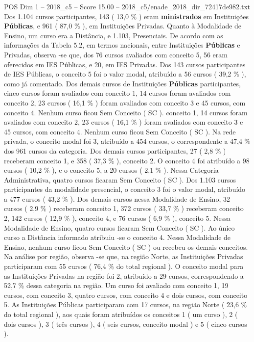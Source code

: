 \begin{textsample}{POS Dim 1 – 2018\_c5 – Score 15.00 – 2018\_c5/enade\_2018\_dir\_72417de982.txt}
Dos 1.104 cursos participantes, 143 ( 13,0 \% ) eram \textbf{ministrados} em Instituições \textbf{Públicas}, e 961 ( 87,0 \% ), em Instituições Privadas.
Quanto à Modalidade de Ensino, um curso era a Distância, e 1.103, Presenciais.
De acordo com as informações da Tabela 5.2, em termos nacionais, entre Instituições \textbf{Públicas} e Privadas, observa -se que, dos 76 cursos avaliados com conceito 5, 56 eram oferecidos em IES Públicas, e 20, em IES Privadas.
Dos 143 cursos participantes de IES Públicas, o conceito 5 foi o valor modal, atribuído a 56 cursos ( 39,2 \% ), como já comentado.
Dos demais cursos de Instituições \textbf{Públicas} participantes, cinco cursos foram avaliados com conceito 1, 14 cursos foram avaliados com conceito 2, 23 cursos ( 16,1 \% ) foram avaliados com conceito 3 e 45 cursos, com conceito 4.
Nenhum curso ficou Sem Conceito ( SC ). conceito 1, 14 cursos foram avaliados com conceito 2, 23 cursos ( 16,1 \% ) foram avaliados com conceito 3 e 45 cursos, com conceito 4.
Nenhum curso ficou Sem Conceito ( SC ).
Na rede privada, o conceito modal foi 3, atribuído a 454 cursos, o correspondente a 47,4 \% dos 961 cursos da categoria.
Dos demais cursos participantes, 27 ( 2,8 \% ) receberam conceito 1, e 358 ( 37,3 \% ), conceito 2.
O conceito 4 foi atribuído a 98 cursos ( 10,2 \% ), e o conceito 5, a 20 cursos ( 2,1 \% ).
Nessa Categoria Administrativa, quatro cursos ficaram Sem Conceito ( SC ).
Dos 1.103 cursos participantes da modalidade presencial, o conceito 3 foi o valor modal, atribuído a 477 cursos ( 43,2 \% ).
Dos demais cursos nessa Modalidade de Ensino, 32 cursos ( 2,9 \% ) receberam conceito 1, 372 cursos ( 33,7 \% ) receberam conceito 2, 142 cursos ( 12,9 \% ), conceito 4, e 76 cursos ( 6,9 \% ), conceito 5.
Nessa Modalidade de Ensino, quatro cursos ficaram Sem Conceito ( SC ).
Ao único curso a Distância informado atribuiu -se o conceito 4.
Nessa Modalidade de Ensino, nenhum curso ficou Sem Conceito ( SC ) ou recebeu os demais conceitos.
Na análise por região, observa -se que, na região Norte, as Instituições Privadas participaram com 55 cursos ( 76,4 \% do total regional ).
O conceito modal para as Instituições Privadas na região foi 2, atribuído a 29 cursos, correspondendo a 52,7 \% dessa categoria na região.
Um curso foi avaliado com conceito 1, 19 cursos, com conceito 3, quatro cursos, com conceito 4 e dois cursos, com conceito 5.
As Instituições Públicas participaram com 17 cursos, na região Norte ( 23,6 \% do total regional ), aos quais foram atribuídos os conceitos 1 ( um curso ), 2 ( dois cursos ), 3 ( três cursos ), 4 ( seis cursos, conceito modal ) e 5 ( cinco cursos ).

\end{textsample}
